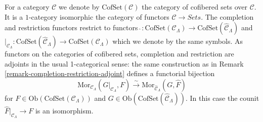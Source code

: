 \begin{remark}
\label{remark-completion-restriction-cofset-adjoint}
For a category $\mathcal{C}$ we denote by $\text{CofSet}(\mathcal{C})$ the 
category of cofibered sets over $\mathcal{C}$.  It is a $1$-category isomorphic 
the category of functors $\mathcal{C} \to \textit{Sets}$.  The 
completion and restriction functors restrict to functors $\widehat{~}: 
\text{CofSet}(\mathcal{C}_\Lambda) \to 
\text{CofSet}(\widehat{\mathcal{C}}_\Lambda)$ and $|_{\mathcal 
C_\Lambda}: \text{CofSet}(\widehat{\mathcal{C}}_\Lambda) \to 
\text{CofSet}(\mathcal{C}_\Lambda)$ which we denote by the same symbols. 
 As functors on the categories of cofibered sets, completion and restriction 
are adjoints in the usual 1-categorical sense: the same construction as in 
Remark \ref{remark-completion-restriction-adjoint} defines a functorial 
bijection
\[ 
\text{Mor}_{\mathcal{C}_\Lambda}(G|_{\mathcal{C}_\Lambda}, F) 
\xrightarrow{\sim} 
\text{Mor}_{\widehat{\mathcal{C}}_\Lambda}(G, \widehat{F}) 
\]
for $F \in \text{Ob}(\text{CofSet}(\mathcal{C}_\Lambda))$ and $G 
\in \text{Ob}(\text{CofSet}(\widehat{\mathcal{C}}_\Lambda))$.  In 
this case the counit $\widehat{F}|_{\mathcal{C}_\Lambda} \to F$ is an 
isomorphism.
\end{remark}

